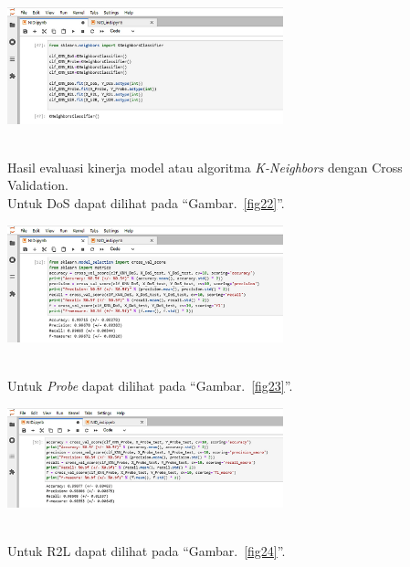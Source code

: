 \documentclass[conference]{IEEEtran}
\begin{document}
\begin{minipage}{\linewidth}
\centerline{\includegraphics[width=80mm]{Gambar/Gbr20.jpg}}
\label{fig21}
\end{minipage}\\

Hasil evaluasi kinerja model atau algoritma \emph{K-Neighbors} dengan Cross Validation.\\
Untuk DoS dapat dilihat pada ``Gambar.~\ref{fig22}''.\\

\begin{minipage}{\linewidth}
\centerline{\includegraphics[width=80mm]{Gambar/Gbr21.jpg}}
\label{fig22}
\end{minipage}\\

\noindent Untuk \emph{Probe} dapat dilihat pada ``Gambar.~\ref{fig23}''.\\

\begin{minipage}{\linewidth}
\centerline{\includegraphics[width=80mm]{Gambar/Gbr22.jpg}}
\label{fig23}
\end{minipage}\\

\noindent Untuk R2L dapat dilihat pada ``Gambar.~\ref{fig24}''.\\
\end{document}
